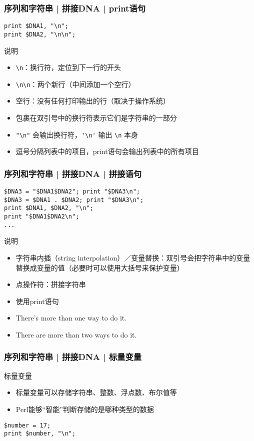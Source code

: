\begin{frame}[fragile]
  \frametitle{序列和字符串 | 拼接DNA | \alert{print语句}}
\begin{lstlisting}
print $DNA1, "\n";
print $DNA2, "\n\n";
\end{lstlisting}
\pause
\begin{block}{说明}
  \begin{itemize}
    \item \verb|\n|：换行符，定位到下一行的开头
    \item \verb|\n\n|：两个新行（中间添加一个空行）
    \item 空行：没有任何打印输出的行（取决于操作系统）
    \item 包裹在双引号中的换行符表示它们是字符串的一部分
    \item \verb|"\n"| 会输出换行符，\verb|'\n'| 输出 \verb|\n| 本身
    \item 逗号分隔列表中的项目，print语句会输出列表中的所有项目
  \end{itemize}
\end{block}
\end{frame}

\begin{frame}[fragile]
  \frametitle{序列和字符串 | 拼接DNA | \alert{拼接语句}}
  \vspace{-0.5em}
\begin{lstlisting}
$DNA3 = "$DNA1$DNA2"; print "$DNA3\n";
$DNA3 = $DNA1 . $DNA2; print "$DNA3\n";
print $DNA1, $DNA2, "\n";
print "$DNA1$DNA2\n";
...
\end{lstlisting}
\begin{block}{说明}
\begin{itemize}
  \item 字符串内插（string interpolation）／变量替换：双引号会把字符串中的变量替换成变量的值（必要时可以使用大括号来保护变量）
  \item 点操作符：拼接字符串
  \item 使用print语句
  \item There's more than one way to do it.
  \item There are more than two ways to do it.
\end{itemize}
\end{block}
\end{frame}

\begin{frame}[fragile]
  \frametitle{序列和字符串 | 拼接DNA | 标量变量}
  \begin{block}{标量变量}
    \begin{itemize}
      \item 标量变量可以存储字符串、整数、浮点数、布尔值等
      \item Perl能够“智能”判断存储的是哪种类型的数据
    \end{itemize}
  \end{block}
  \pause
\begin{lstlisting}
$number = 17;
print $number, "\n";
\end{lstlisting}
\end{frame}

